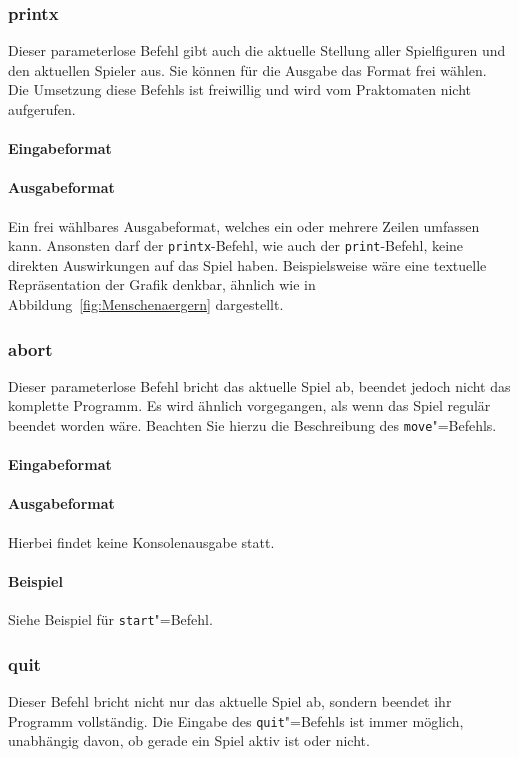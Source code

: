 \subsubsection*{printx}
Dieser parameterlose Befehl gibt auch die aktuelle Stellung aller Spielfiguren und den aktuellen Spieler aus. Sie können für die Ausgabe das Format frei wählen. Die Umsetzung diese Befehls ist freiwillig und wird vom Praktomaten nicht aufgerufen.
\paragraph{Eingabeformat}
\paragraph{Ausgabeformat}
Ein frei wählbares Ausgabeformat, welches ein oder mehrere Zeilen umfassen kann. Ansonsten darf der \texttt{printx}-Befehl, wie auch der \texttt{print}-Befehl, keine direkten Auswirkungen auf das Spiel haben. Beispielsweise wäre eine textuelle Repräsentation der Grafik denkbar, ähnlich wie in Abbildung~\ref{fig:Menschenaergern} dargestellt. 

\subsubsection*{abort}
Dieser parameterlose Befehl bricht das aktuelle Spiel ab, beendet jedoch nicht das komplette Programm. Es wird ähnlich vorgegangen, als wenn das Spiel regulär beendet worden wäre. Beachten Sie hierzu die Beschreibung des \texttt{move}"=Befehls.
\paragraph{Eingabeformat}
\paragraph{Ausgabeformat}
Hierbei findet keine Konsolenausgabe statt.
\paragraph{Beispiel}
Siehe Beispiel für \texttt{start}"=Befehl.

\subsubsection*{quit}
Dieser Befehl bricht nicht nur das aktuelle Spiel ab, sondern beendet ihr Programm vollständig. Die Eingabe des \texttt{quit}"=Befehls ist immer möglich, unabhängig davon, ob gerade ein Spiel aktiv ist oder nicht.

